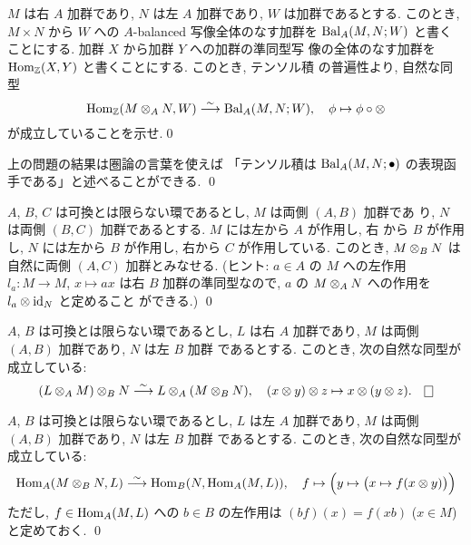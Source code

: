 \documentclass[12pt,twoside]{jarticle}
\begin{document}
\begin{question}
  $M$ は右 $A$ 加群であり, $N$ は左 $A$ 加群であり, $W$ は加群であるとする.
  このとき, $M\times N$ から $W$ への $A$-balanced 写像全体のなす加群を %
  $\mathop{\mathrm{Bal}}\nolimits_A(M,N;W)$ と書くことにする. 加群 $X$ から加群 $Y$ への加群の準同型写
  像の全体のなす加群を $\mathop{\mathrm{Hom}}\nolimits_{\mathbb Z}(X,Y)$ と書くことにする. このとき, テンソル積
  の普遍性より, 自然な同型
  \begin{equation*}
    \mathop{\mathrm{Hom}}\nolimits_{\mathbb Z}(M\otimes_A N, W) \overset\sim\longrightarrow \mathop{\mathrm{Bal}}\nolimits_A(M,N;W), 
    \quad \phi \mapsto \phi\circ\otimes
  \end{equation*}
  が成立していることを示せ.\qed
\end{question}

\begin{guide}
  上の問題の結果は圏論の言葉を使えば
  「テンソル積は $\mathop{\mathrm{Bal}}\nolimits_A(M,N;\bullet)$ の表現函手である」と述べることができる. 
  \qed
\end{guide}

\begin{question}
  $A$, $B$, $C$ は可換とは限らない環であるとし, $M$ は両側 $(A,B)$ 加群であ
  り, $N$ は両側 $(B,C)$ 加群であるとする.  $M$ には左から $A$ が作用し, 右
  から $B$ が作用し, $N$ には左から $B$ が作用し, 右から $C$ が作用している.
  このとき, $M\otimes_B N$ は自然に両側 $(A,C)$ 加群とみなせる.
  (ヒント: $a\in A$ の $M$ への左作用 $l_a:M\to M$, $x\mapsto ax$ は右 $B$ 
  加群の準同型なので, $a$ の $M\otimes_A N$ への作用を $l_a\otimes\mathop{\mathrm{id}}\nolimits_N$ と定めること
  ができる.)
  \qed
\end{question}

\begin{question}[テンソル積の結合性]
  $A$, $B$ は可換とは限らない環であるとし,
  $L$ は右 $A$ 加群であり, $M$ は両側 $(A,B)$ 加群であり, $N$ は左 $B$ 加群
  であるとする. このとき, 次の自然な同型が成立している:
  \begin{equation*}
    (L\o_A M)\o_B N \isomto L\o_A(M\o_B N),
    \quad (x\o y)\o z\mapsto x\o(y\o z).
    \qed
  \end{equation*}
\end{question}

\begin{question}
  $A$, $B$ は可換とは限らない環であるとし,
  $L$ は左 $A$ 加群であり, $M$ は両側 $(A,B)$ 加群であり, $N$ は左 $B$ 加群
  であるとする. このとき, 次の自然な同型が成立している:
  \begin{equation*}
    \mathop{\mathrm{Hom}}\nolimits_A(M\otimes_B N, L) \overset\sim\longrightarrow \mathop{\mathrm{Hom}}\nolimits_B(N,\mathop{\mathrm{Hom}}\nolimits_A(M,L)),
    \quad f \mapsto \Big(y\mapsto\big(x\mapsto f(x\otimes y)\big)\Big)
  \end{equation*}
  ただし, $f\in\mathop{\mathrm{Hom}}\nolimits_A(M,L)$ への $b\in B$ の左作用は $(bf)(x)=f(xb)$ 
  ($x\in M$) と定めておく. \qed 
\end{question}
\end{document}

